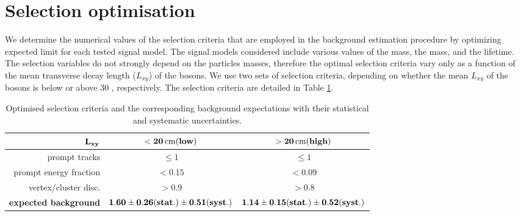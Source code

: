 \section{Selection optimisation}
\label{sec:cutvalues}
We determine the numerical values of the selection criteria that are employed in the background estimation procedure 
by optimizing expected limit for each tested signal model.
The signal models considered include various values of the \Higgs mass, the \X mass, and the \X lifetime.
The selection variables
do not strongly depend on the particles masses, therefore the optimal selection criteria
vary only as a function of the
mean transverse decay length ($L_{xy}$)
of the \X bosons. We use two sets of selection criteria,
depending on whether the mean
$L_{xy}$ of the \X bosons is below or above 30 \cm, respectively. The selection criteria are
detailed in Table \ref{tab:background}.

\begin{table}[htbp]
\centering
\begin{tabular}{r|c|c}
$\bf L_{xy}$ &\bf  $\bf <20\,\text{cm} (low)$ & \bf  $\bf >20\,\text{cm} (high)$ \\
\hline
prompt tracks & $\leq1$ & $\leq1$ \\
prompt energy fraction & $<0.15$ & $<0.09$ \\
vertex/cluster disc. & $>0.9$ & $>0.8$  \\
\hline
\bf expected background & $\bf 1.60\pm0.26(stat.)\pm0.51(syst.)$ & $\bf 1.14\pm0.15(stat.)\pm0.52(syst.)$ \\
\end{tabular}
\caption{Optimised selection criteria and the corresponding background expectations with their statistical and systematic uncertainties.\label{tab:background}}
\end{table}

